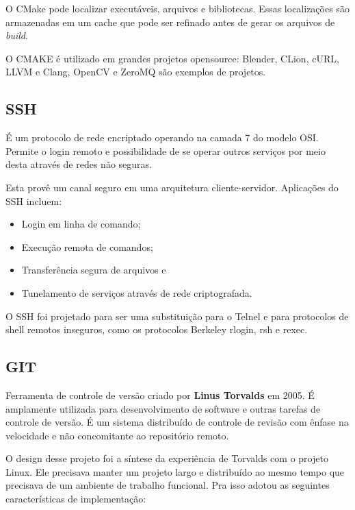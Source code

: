 \documentclass[
	article,			%
	12pt,				%
	oneside,			%
	a4paper,			%
	english,			
	brazil,
	sumario=tradicional
	]{abntex2}
\begin{document}
O CMake pode localizar executáveis, arquivos e bibliotecas. Essas localizações são armazenadas em um cache que pode ser refinado antes de gerar os arquivos de \textit{build}.

O CMAKE é utilizado em grandes projetos opensource: Blender, CLion, cURL, LLVM e Clang, OpenCV e ZeroMQ são exemplos de projetos.

\pagebreak
\subsection{SSH}
É um protocolo de rede encriptado operando na camada 7 do modelo OSI. Permite o login remoto e possibilidade de se operar outros serviços por meio desta através de redes não seguras.

Esta provê um canal seguro em uma arquitetura cliente-servidor. Aplicações do SSH incluem:

\begin{itemize}
	\item{Login em linha de comando;}
	\item{Execução remota de comandos;}
	\item{Transferência segura de arquivos e}
	\item{Tunelamento de serviços através de rede criptografada.}
\end{itemize}

O SSH foi projetado para ser uma substituição para o Telnel e para protocolos de shell remotos inseguros, como os protocolos Berkeley rlogin, rsh e rexec.

\pagebreak
\subsection{GIT}


Ferramenta de controle de versão criado por \textbf{Linus Torvalds} em 2005. É amplamente utilizada para desenvolvimento de software e outras tarefas de controle de versão. É um sistema distribuído de controle de revisão com ênfase na velocidade e não concomitante ao repositório remoto. 

O design desse projeto foi a síntese da experiência de Torvalds com o projeto Linux. Ele precisava manter um projeto largo e distribuído ao mesmo tempo que precisava de um ambiente de trabalho funcional. Pra isso adotou as seguintes características de implementação:
\end{document}
